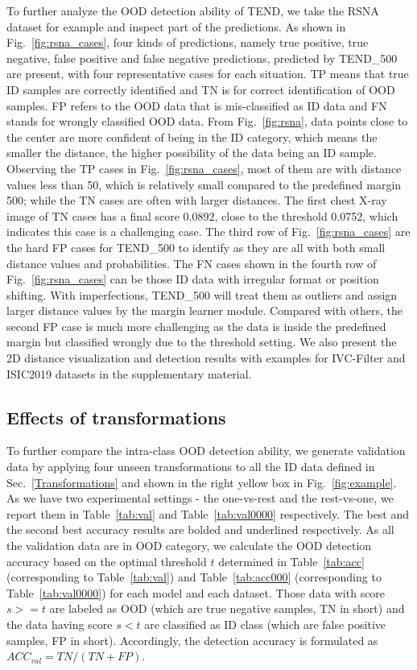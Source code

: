 \documentclass[12pt]{spieman}  %
\begin{document}
\begin{spacing}{2}
To further analyze the OOD detection ability of TEND, we take the RSNA dataset for example and inspect part of the predictions. As shown in  
Fig.~\ref{fig:rsna_cases}, four kinds of predictions, namely true positive, true negative, false positive and false negative predictions, 
predicted by TEND\_500 are present, with four representative cases for each situation. TP means that true ID samples are correctly identified and TN is for correct identification of OOD samples. FP refers to the OOD data that is mis-classified as ID data and FN stands for wrongly classified OOD data.
From Fig.~\ref{fig:rsna}, data points close to the center are more confident of being in the ID category, which means the smaller the distance, the higher possibility of the data being an ID sample. Observing the TP cases in Fig.~\ref{fig:rsna_cases}, most of them are with distance values less than 50, which is relatively small compared to the predefined margin 500; while the TN cases are often with larger distances. The first chest X-ray image of TN cases has a final score 0.0892, close to the threshold 0.0752, which indicates this case is a challenging case. The third row of Fig.~\ref{fig:rsna_cases} are the hard FP cases for TEND\_500 to identify as they are all with both small distance values and probabilities. The FN cases shown in the fourth row of Fig.~\ref{fig:rsna_cases} can be those ID data with irregular format or position shifting. With imperfections, TEND\_500 will treat them as outliers and assign larger distance values by the margin learner module. Compared with others, the second FP case is much more challenging as the data is inside the predefined margin but classified wrongly due to the threshold setting. We also present the 2D distance visualization and detection results with examples for IVC-Filter and ISIC2019 datasets in the supplementary material.     



\subsection{Effects of transformations}\label{nonlinear_trans}
To further compare the intra-class OOD detection ability, we generate validation data by applying four unseen transformations to all the ID data defined in Sec.~\ref{Transformations} and shown in the right yellow box in Fig.~\ref{fig:example}. As we have two experimental settings - the one-vs-rest and the rest-vs-one, we report them in Table~\ref{tab:val} and Table~\ref{tab:val0000} respectively. The best and the second best accuracy results are bolded and underlined respectively. As all the validation data are in OOD category, we calculate the OOD detection accuracy based on the optimal threshold $t$ determined in Table~\ref{tab:acc} (corresponding to Table~\ref{tab:val}) and Table~\ref{tab:acc000} (corresponding to Table~\ref{tab:val0000}) for each model and each dataset. Those data with score $s>=t$ are labeled as OOD (which are true negative samples, TN in short) and the data having score $s<t$ are classified as ID class (which are false positive samples, FP in short). Accordingly, the detection accuracy is formulated as $ACC_{val}= TN / (TN + FP)$.  


\end{spacing}
\end{document}
